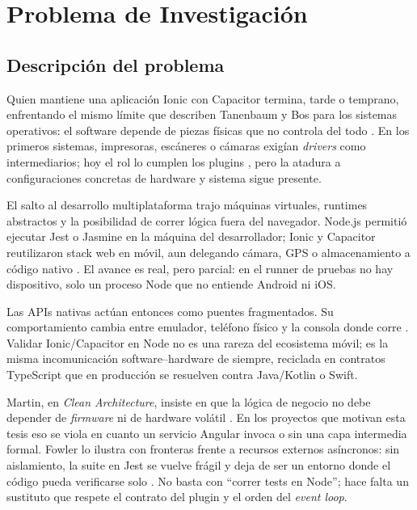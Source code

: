 \section{Problema de Investigación}
\label{chap:problema_investigacion}

\subsection{Descripción del problema}
\label{sec:descripcion_problema}

Quien mantiene una aplicación Ionic con Capacitor termina, tarde o temprano, enfrentando el mismo límite que describen Tanenbaum y Bos para los sistemas operativos: el software depende de piezas físicas que no controla del todo \cite{tanenbaum2015modern_os}. En los primeros sistemas, impresoras, escáneres o cámaras exigían \textit{drivers} como intermediarios; hoy el rol lo cumplen los plugins , pero la atadura a configuraciones concretas de hardware y sistema sigue presente.

El salto al desarrollo multiplataforma trajo máquinas virtuales, runtimes abstractos y la posibilidad de correr lógica fuera del navegador. Node.js permitió ejecutar Jest o Jasmine en la máquina del desarrollador; Ionic y Capacitor reutilizaron stack web en móvil, aun delegando cámara, GPS o almacenamiento a código nativo \cite{nie2023gui_mobile_mapping}. El avance es real, pero parcial: en el runner de pruebas no hay dispositivo, solo un proceso Node que no entiende Android ni iOS.

Las APIs nativas actúan entonces como puentes fragmentados. Su comportamiento cambia entre emulador, teléfono físico y la consola donde corre . Validar Ionic/Capacitor en Node no es una rareza del ecosistema móvil; es la misma incomunicación software--hardware de siempre, reciclada en contratos TypeScript que en producción se resuelven contra Java/Kotlin o Swift.

Martin, en \textit{Clean Architecture}, insiste en que la lógica de negocio no debe depender de \textit{firmware} ni de hardware volátil \cite{martin2017clean}. En los proyectos que motivan esta tesis eso se viola en cuanto un servicio Angular invoca  o  sin una capa intermedia formal. Fowler lo ilustra con fronteras frente a recursos externos asíncronos: sin aislamiento, la suite en Jest se vuelve frágil y deja de ser un entorno donde el código pueda verificarse solo \cite{fowler2002poeaa}. No basta con ``correr tests en Node''; hace falta un sustituto que respete el contrato del plugin y el orden del \textit{event loop}.


